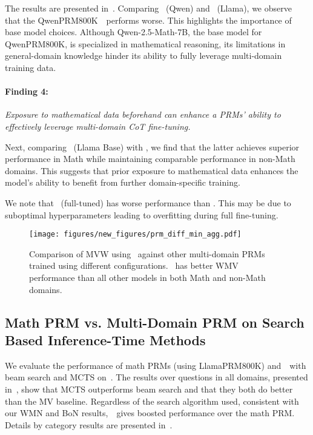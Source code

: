 The results are presented in~.
Comparing \ourprm~(Qwen) and \ourprm~(Llama), we observe that the QwenPRM800K~\ourprm~performs worse.
This highlights the importance of base model choices. Although Qwen-2.5-Math-7B, the base model for QwenPRM800K, is specialized in mathematical reasoning, its limitations in general-domain knowledge hinder its ability to fully leverage multi-domain training data.


\begin{highlight}
    \paragraph{Finding 4:} 
    \emph{Exposure to mathematical data beforehand can enhance a PRMs' ability to effectively leverage multi-domain CoT fine-tuning.}
\end{highlight}


Next, comparing \ourprm~(Llama Base) with \ourprm, we find that the latter achieves superior performance in Math while maintaining comparable performance in non-Math domains. This suggests that prior exposure to mathematical data enhances the model’s ability to benefit from further domain-specific training.

We note that \ourprm~(full-tuned) has worse performance than \ourprm.
This may be due to suboptimal hyperparameters leading to overfitting during full fine-tuning.


\begin{figure}[t]
    \centering
    \texttt{[image: figures/new\_figures/prm\_diff\_min\_agg.pdf]}
    \caption{Comparison of MVW using \ourprm~against other multi-domain PRMs trained using different configurations. \ourprm~has better WMV performance than all other models in both Math and non-Math domains.}
    \label{fig:multiprm-trainexps}
\end{figure}



    
\subsection{Math PRM vs. Multi-Domain PRM on Search Based Inference-Time Methods}
\label{sec:m-v-mdprm-search}

We evaluate the performance of math PRMs (using LlamaPRM800K) and~\ourprm~with beam search and MCTS on~\ourdataeval.
The results over questions in all domains, presented in~,
show that MCTS outperforms beam search and that they both do better than the MV baseline.
Regardless of the search algorithm used, consistent with our WMN and BoN results,~\ourprm~gives boosted performance over the math PRM.
Details by category results are presented in~.


